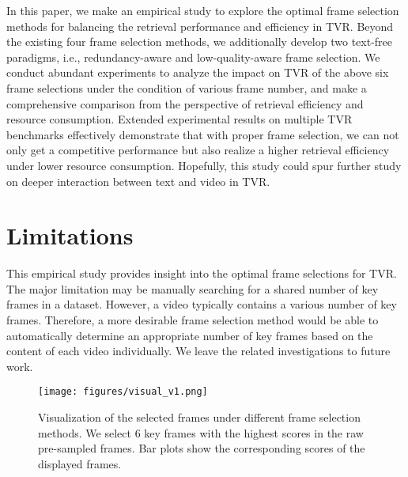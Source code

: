 \documentclass[11pt]{article}
\begin{document}
In this paper, we make an empirical study to explore the optimal frame selection methods for balancing the retrieval performance and efficiency in TVR.
Beyond the existing four frame selection methods, we additionally develop two text-free paradigms, i.e., redundancy-aware and low-quality-aware frame selection.
We conduct abundant experiments to analyze the impact on TVR of the above six frame selections under the condition of various frame number, and make a comprehensive comparison from the perspective of retrieval efficiency and resource consumption.
Extended experimental results on multiple TVR benchmarks effectively demonstrate that with proper frame selection, we can not only get a competitive performance but also realize a higher retrieval efficiency under lower resource consumption.
Hopefully, this study could spur further study on deeper interaction between text and video in TVR.

\section*{Limitations}

This empirical study provides insight into the optimal frame selections for TVR.
The major limitation may be manually searching for a shared number of key frames in a dataset.
However, a video typically contains a various number of key frames.
Therefore, a more desirable frame selection method would be able to automatically determine an appropriate number of key frames based on the content of each video individually.
We leave the related investigations to future work.




\appendix

\begin{figure*}[h]
\label{overall structure}
\centerline{\texttt{[image: figures/visual\_v1.png]}}
\caption{Visualization of the selected frames under different frame selection methods.
We select 6 key frames with the highest scores in the raw pre-sampled frames.
Bar plots show the corresponding scores of the displayed frames.
}  \label{visual}
\end{figure*}
\end{document}
